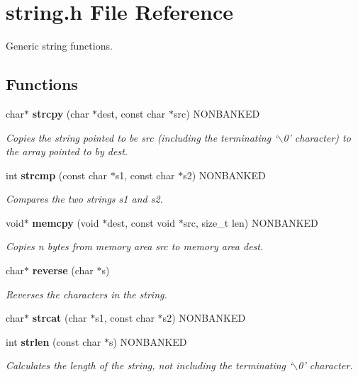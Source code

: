 \section{string.h File Reference}
\label{string.h}
Generic string functions. 


\subsection*{Functions}
\begin{CompactItemize}
\item 
char$\ast$ {\bf strcpy} (char $\ast$dest, const char $\ast$src) NONBANKED
\begin{CompactList}\small\item\em Copies the string pointed to be src (including the terminating `$\backslash$0' character) to the array pointed to by dest.\item\end{CompactList}

\item 
int {\bf strcmp} (const char $\ast$s1, const char $\ast$s2) NONBANKED
\begin{CompactList}\small\item\em Compares the two strings s1 and s2.\item\end{CompactList}

\item 
void$\ast$ {\bf memcpy} (void $\ast$dest, const void $\ast$src, size\_\-t len) NONBANKED
\begin{CompactList}\small\item\em Copies n bytes from memory area src to memory area dest.\item\end{CompactList}

\item 
char$\ast$ {\bf reverse} (char $\ast$s)
\begin{CompactList}\small\item\em Reverses the characters in the string.\item\end{CompactList}

\item 
\label{string.h_a4}
char$\ast$ {\bf strcat} (char $\ast$s1, const char $\ast$s2) NONBANKED
\item 
\label{string.h_a5}
int {\bf strlen} (const char $\ast$s) NONBANKED
\begin{CompactList}\small\item\em Calculates the length of the string, not including the terminating `$\backslash$0' character.\item\end{CompactList}


\end{CompactItemize}
